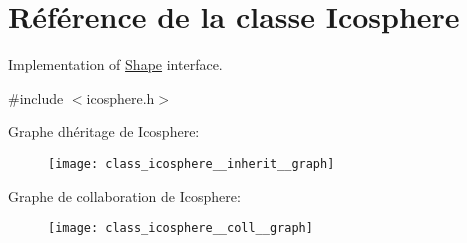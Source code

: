 \hypertarget{class_icosphere}{}\section{Référence de la classe Icosphere}
\label{class_icosphere}


Implementation of \hyperlink{class_shape}{Shape} interface.  




{\ttfamily \#include $<$icosphere.\+h$>$}



Graphe d\textquotesingle{}héritage de Icosphere\+:
\nopagebreak
\begin{figure}[H]
\begin{center}
\leavevmode
\texttt{[image: class\_icosphere\_\_inherit\_\_graph]}
\end{center}
\end{figure}


Graphe de collaboration de Icosphere\+:
\nopagebreak
\begin{figure}[H]
\begin{center}
\leavevmode
\texttt{[image: class\_icosphere\_\_coll\_\_graph]}
\end{center}
\end{figure}
